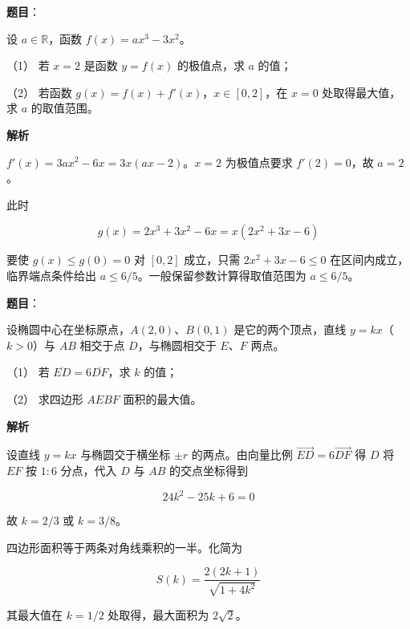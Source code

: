 \begin{answer}

\textbf{题目}：

设 $a\in\mathbb R$，函数 $f(x)=ax^3-3x^2$。

（1） 若 $x=2$ 是函数 $y=f(x)$ 的极值点，求 $a$ 的值；

（2） 若函数 $g(x)=f(x)+f'(x)$，$x\in[0,2]$，在 $x=0$ 处取得最大值，求 $a$ 的取值范围。

\textbf{解析}


$f'(x)=3ax^2-6x=3x(ax-2)$。$x=2$ 为极值点要求 $f'(2)=0$，故 $a=2$。


此时

\nopagebreak[4]
\[
g(x)=2x^3+3x^2-6x=x(2x^2+3x-6)
\]

要使 $g(x)\leqslant g(0)=0$ 对 $[0,2]$ 成立，只需 $2x^2+3x-6\leqslant0$ 在区间内成立，临界端点条件给出 $a\leqslant6/5$。一般保留参数计算得取值范围为 $a\leqslant6/5$。



\end{answer}
\begin{answer}

\textbf{题目}：

设椭圆中心在坐标原点，$A(2,0)$、$B(0,1)$ 是它的两个顶点，直线 $y=kx$（$k>0$）与 $AB$ 相交于点 $D$，与椭圆相交于 $E\text{、}F$ 两点。

（1） 若 $\overline{ED}=6\overline{DF}$，求 $k$ 的值；

（2） 求四边形 $AEBF$ 面积的最大值。

\textbf{解析}


设直线 $y=kx$ 与椭圆交于横坐标 $\pm r$ 的两点。由向量比例 $\overrightarrow{ED}=6\overrightarrow{DF}$ 得 $D$ 将 $EF$ 按 $1:6$ 分点，代入 $D$ 与 $AB$ 的交点坐标得到

\nopagebreak[4]
\[
24k^2-25k+6=0
\]

故 $k=2/3$ 或 $k=3/8$。


四边形面积等于两条对角线乘积的一半。化简为

\nopagebreak[4]
\[
S(k)=\frac{2(2k+1)}{\sqrt{1+4k^2}}
\]

其最大值在 $k=1/2$ 处取得，最大面积为 $2\sqrt2$。



\end{answer}